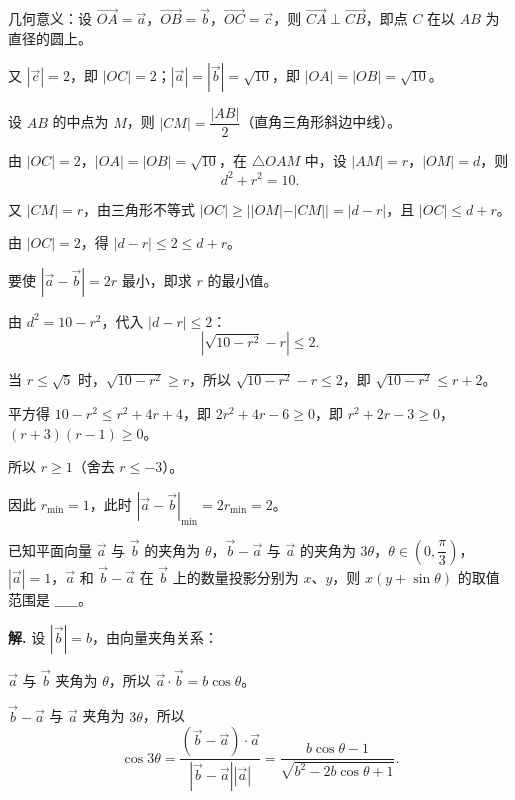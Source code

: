\documentclass[11pt]{ctexrep}
\begin{document}
几何意义：设 $\overrightarrow{OA} = \overrightarrow{a}$，$\overrightarrow{OB} = \overrightarrow{b}$，$\overrightarrow{OC} = \overrightarrow{c}$，则 $\overrightarrow{CA} \perp \overrightarrow{CB}$，即点 $C$ 在以 $AB$ 为直径的圆上。

又 $|\overrightarrow{c}| = 2$，即 $|OC| = 2$；$|\overrightarrow{a}| = |\overrightarrow{b}| = \sqrt{10}$，即 $|OA| = |OB| = \sqrt{10}$。

设 $AB$ 的中点为 $M$，则 $|CM| = \dfrac{|AB|}{2}$（直角三角形斜边中线）。

由 $|OC| = 2$，$|OA| = |OB| = \sqrt{10}$，在 $\triangle OAM$ 中，设 $|AM| = r$，$|OM| = d$，则
\[
    d^2 + r^2 = 10.
\]

又 $|CM| = r$，由三角形不等式 $|OC| \geq ||OM| - |CM|| = |d-r|$，且 $|OC| \leq d + r$。

由 $|OC| = 2$，得 $|d-r| \leq 2 \leq d+r$。

要使 $|\overrightarrow{a} - \overrightarrow{b}| = 2r$ 最小，即求 $r$ 的最小值。

由 $d^2 = 10 - r^2$，代入 $|d-r| \leq 2$：
\[
    |\sqrt{10-r^2} - r| \leq 2.
\]

当 $r \leq \sqrt{5}$ 时，$\sqrt{10-r^2} \geq r$，所以 $\sqrt{10-r^2} - r \leq 2$，即 $\sqrt{10-r^2} \leq r+2$。

平方得 $10-r^2 \leq r^2 + 4r + 4$，即 $2r^2 + 4r - 6 \geq 0$，即 $r^2 + 2r - 3 \geq 0$，$(r+3)(r-1) \geq 0$。

所以 $r \geq 1$（舍去 $r \leq -3$）。

因此 $r_{\min} = 1$，此时 $|\overrightarrow{a} - \overrightarrow{b}|_{\min} = 2r_{\min} = 2$。

\begin{realexam}[2025 松江一模]
    已知平面向量 $\overrightarrow{a}$ 与 $\overrightarrow{b}$ 的夹角为 $\theta$，$\overrightarrow{b} - \overrightarrow{a}$ 与 $\overrightarrow{a}$ 的夹角为 $3\theta$，$\theta \in \left(0, \dfrac{\pi}{3}\right)$，$|\overrightarrow{a}| = 1$，$\overrightarrow{a}$ 和 $\overrightarrow{b} - \overrightarrow{a}$ 在 $\overrightarrow{b}$ 上的数量投影分别为 $x$、$y$，则 $x(y + \sin\theta)$ 的取值范围是 $\_\_\_\_\_$。
\end{realexam}

\textbf{解.} 设 $|\overrightarrow{b}| = b$，由向量夹角关系：

$\overrightarrow{a}$ 与 $\overrightarrow{b}$ 夹角为 $\theta$，所以 $\overrightarrow{a} \cdot \overrightarrow{b} = b\cos\theta$。

$\overrightarrow{b} - \overrightarrow{a}$ 与 $\overrightarrow{a}$ 夹角为 $3\theta$，所以
\[
    \cos 3\theta = \dfrac{(\overrightarrow{b}-\overrightarrow{a}) \cdot \overrightarrow{a}}{|\overrightarrow{b}-\overrightarrow{a}||\overrightarrow{a}|} = \dfrac{b\cos\theta - 1}{\sqrt{b^2 - 2b\cos\theta + 1}}.
\]
\end{document}

